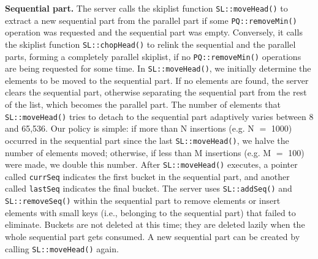 \textbf{Sequential part.} 
The server calls the skiplist function \texttt{SL::moveHead()} to extract a new sequential part from the parallel part if some \texttt{PQ::removeMin()} operation was requested and the sequential part was empty. 
Conversely, it calls the skiplist function \texttt{SL::chopHead()} to relink the sequential and the parallel parts, forming a completely parallel skiplist, if no \texttt{PQ::removeMin()} operations are being requested for some time.
In \texttt{SL::moveHead()}, we initially determine the elements to be moved to the sequential part. If no elements are found, the server clears the sequential part, otherwise separating the sequential part from the rest of the list, which becomes the parallel part. The number of elements that \texttt{SL::moveHead()} tries to detach to the sequential part adaptively varies between 8 and 65,536. Our policy is simple: if more than N insertions (e.g. N $=$ 1000) occurred in the sequential part since the last \texttt{SL::moveHead()}, we halve the number of elements moved; otherwise, if less than M insertions (e.g. M $=$ 100) were made, we double this number.
After \texttt{SL::moveHead()} executes, a pointer called \texttt{currSeq} indicates the first bucket in the sequential part, and another called \texttt{lastSeq} indicates the final bucket.
The server uses \texttt{SL::addSeq()} and \texttt{SL::removeSeq()} within the sequential part to remove elements or insert elements with small keys (i.e., belonging to the sequential part) that failed to eliminate.
Buckets are not deleted at this time; they are deleted lazily when the whole sequential part gets consumed. A new sequential part can be created by calling \texttt{SL::moveHead()} again.

